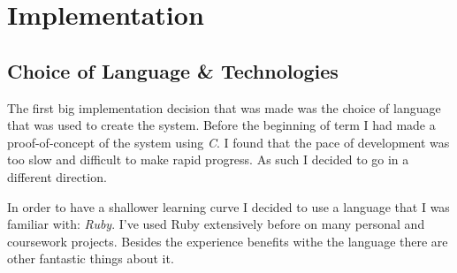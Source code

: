 \chapter{Implementation}

\section{Choice of Language \& Technologies}

The first big implementation decision that was made was the choice of language
that was used to create the system. Before the beginning of term I had made
a proof-of-concept of the system using \emph{C}. I found that the pace of
development was too slow and difficult to make rapid progress. As such
I decided to go in a different direction.

In order to have a shallower learning curve I decided to use a language that
I was familiar with: \emph{Ruby}. I've used Ruby extensively before on many
personal and coursework projects. Besides the experience benefits withe the
language there are other fantastic things about it.

